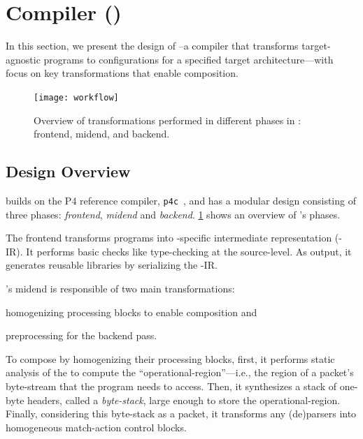 \documentclass[letterpaper,twocolumn,10pt]{article}
\begin{document}
\section{\ulang Compiler (\ucomp)}
\label{sec:compiler}
In this section, we present the design of \ucomp--a compiler that
transforms target-agnostic \ulang programs to configurations for a
specified target architecture---with focus on key transformations that
enable composition.

\begin{figure}[!tbh]
  \centering
  \texttt{[image: workflow]}
  \caption{Overview of transformations performed in different phases
  in \ucomp: frontend, midend, and backend.}
  \label{fig:workflow}
\end{figure}

\subsection{\ucomp Design Overview}
\label{sec:compiler-design}
\ucomp builds on the P4 reference compiler, \texttt{p4c}~\cite{p4c},
and has a modular design consisting of three phases: \emph{frontend},
\emph{midend} and \emph{backend}. \cref{fig:workflow} shows an
overview of \ucomp's phases.

%
The frontend transforms \ulang programs into \ucomp-specific
intermediate representation (\ucomp-IR). It performs basic checks like
type-checking at the source-level. As output, it generates reusable
libraries by serializing the \ucomp-IR.

%
\ucomp's midend is responsible of two main transformations:
\begin{enumerate*}[label=(\roman*)]
  \item homogenizing processing blocks to enable composition and
  \item preprocessing for the backend pass.
\end{enumerate*}

To compose \uprograms by homogenizing their processing blocks, first,
it performs static analysis of the \uprogram to compute the
``operational-region''---i.e., the region of a packet's byte-stream
that the program needs to access. Then, it synthesizes a stack of
one-byte headers, called a \emph{byte-stack}, large enough to store
the operational-region. Finally, considering this byte-stack as a
packet, it transforms any (de)parsers into homogeneous match-action
control blocks.
\end{document}
